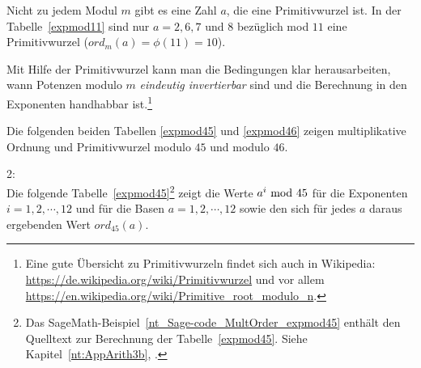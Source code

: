 \begin{refsegment}
Nicht zu jedem Modul $m$ gibt es eine Zahl $a$, die eine
Primitivwurzel ist. %
In der Tabelle~\ref{expmod11} sind nur $a = 2, 6, 7$ und $8$ bezüglich mod
$11$ eine Primitivwurzel ($ord_m(a) = \phi(11) = 10$).

Mit Hilfe der Primitivwurzel kann man die Bedingungen
klar herausarbeiten, wann Potenzen modulo $m$ {\em eindeutig invertierbar}
 sind und die Berechnung in den Exponenten handhabbar
ist.\footnote{%
  Eine gute Übersicht zu Primitivwurzeln findet sich auch in Wikipedia:
  \url{https://de.wikipedia.org/wiki/Primitivwurzel} und vor allem
  \url{https://en.wikipedia.org/wiki/Primitive_root_modulo_n}.
}

Die folgenden beiden Tabellen \ref{expmod45} und \ref{expmod46} zeigen
multiplikative Ordnung und Primitivwurzel modulo
$45$ und modulo $46$.

\begin{example}{ 2:}\\
Die folgende Tabelle~\ref{expmod45}\footnote{%
  Das SageMath-Beispiel~\ref{nt_Sage-code_MultOrder_expmod45} enthält den
  Quelltext zur Berechnung der Tabelle~\ref{expmod45}.
  Siehe Kapitel~\ref{nt:AppArith3b}, \glqq {}\grqq.}
zeigt die Werte $a^i{\rm ~mod~}45$ für die Exponenten $i = 1, 2, \cdots, 12$
und für die Basen $a = 1, 2, \cdots, 12$ sowie den sich für jedes $a$ daraus
ergebenden Wert $ord_{45}(a)$.
\end{example}


\end{refsegment}
